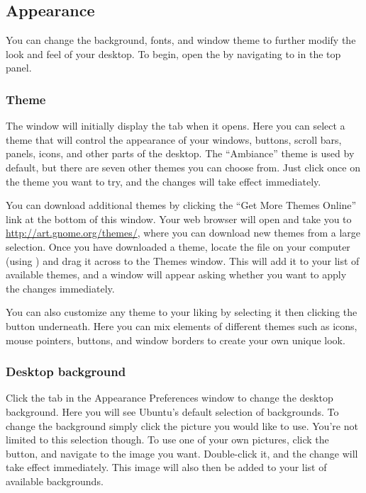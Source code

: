 \subsection{Appearance}
You can change the background, fonts, and window theme to further modify the
look and feel of your desktop. To begin, open the  by navigating to 
in the top panel.



\subsubsection{Theme}
The  window will initially display the  tab when it opens. Here you can select a theme that will control the appearance of your windows, buttons, scroll bars, panels, icons, and other parts of the desktop.  The ``Ambiance'' theme is used by default, but there are seven other themes you can choose from. Just click once on the theme you want to try, and the changes will take effect immediately.

You can download additional themes by clicking the ``Get More Themes Online'' link at the bottom of this window. Your web browser will open and take you to \url{http://art.gnome.org/themes/}, where you can download new themes from a large selection. Once you have downloaded a theme, locate the file on your computer (using ) and drag it across to the Themes window. This will add it to your list of available themes, and a window will appear asking whether you want to apply the changes immediately.

You can also customize any theme to your liking by selecting it then clicking the  button underneath. Here you can mix elements of different themes such as icons, mouse pointers, buttons, and window borders to create your own unique look.


\subsubsection{Desktop background}

Click the  tab in the Appearance Preferences window to
change the desktop background. Here you will see Ubuntu's default selection of
backgrounds. To change the background simply click the picture you
would like to use. You're not limited to this selection though. To use one of your own pictures,
click the  button, and navigate to the
image you want. Double-click it, and the change will take effect immediately.
This image will also then be added to your list of available backgrounds.

